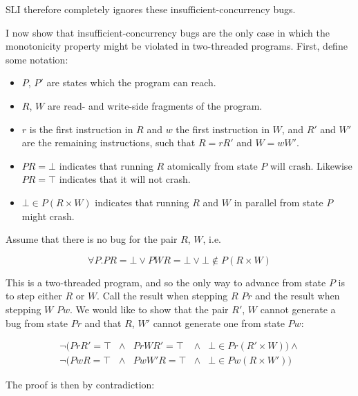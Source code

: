 SLI therefore completely ignores these insufficient-concurrency bugs.

I now show that insufficient-concurrency bugs are the only case in
which the monotonicity property might be violated in two-threaded
programs.
First, define some notation:

\begin{itemize}
\item $P$, $P'$ are states which the program can reach.
\item $R$, $W$ are read- and write-side fragments of the program.
\item $r$ is the first instruction in $R$ and $w$ the first
  instruction in $W$, and $R'$ and $W'$ are the remaining
  instructions, such that $R = rR'$ and $W = wW'$.
\item $PR = \bot$ indicates that running $R$ atomically from state $P$
  will crash.  Likewise $PR = \top$ indicates that it will not crash.
\item $\bot \in P(R \times W)$ indicates that running $R$ and $W$ in
  parallel from state $P$ might crash.
\end{itemize}

Assume that there is no bug for the pair $R$, $W$, i.e.

\begin{displaymath}
  {\forall}P.PR = \bot \vee PWR = \bot \vee \bot \not\in P(R \times W)
\end{displaymath}

This is a two-threaded program, and so the only way to advance from
state $P$ is to step either $R$ or $W$.  Call the result when stepping
$R$ $Pr$ and the result when stepping $W$ $Pw$.  We would like to show
that the pair $R'$, $W$ cannot generate a bug from state $Pr$ and that
$R$, $W'$ cannot generate one from state $Pw$:

\begin{displaymath}
\begin{array}{lllll}
  {\neg}(PrR' = \top & \wedge & PrWR'  = \top & \wedge & \bot \in Pr(R' \times W)) \wedge \\
  {\neg}(PwR  = \top & \wedge & PwW'R = \top  & \wedge & \bot \in Pw(R  \times W'))
\end{array}
\end{displaymath}

The proof is then by contradiction: 

